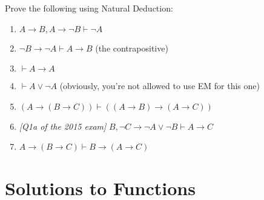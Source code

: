 \documentclass[10pt,a4paper]{article}
\begin{document}
Prove the following using Natural Deduction:

\begin{enumerate}
    \item \( A \rightarrow B , A \rightarrow \neg B \vdash \neg A \)
    \item \( \neg B \rightarrow \neg A \vdash A \rightarrow B \) (the contrapositive)
    \item \( \vdash A \rightarrow A \)
    \item \( \vdash A \lor \neg A \) (obviously, you're not allowed to use EM for this one)
    \item \( \left( A \rightarrow (B \rightarrow C ) \right) \vdash 
    \left( (A \rightarrow B) \rightarrow (A \rightarrow C) \right) \)
    \item \emph{[Q1a of the 2015 exam]} \( B, \neg C \rightarrow \neg A \lor \neg B \vdash A \rightarrow C \)
    \item \( A \rightarrow ( B \rightarrow C ) \vdash B \rightarrow ( A \rightarrow C) \)
\end{enumerate}

\newpage

\section{Solutions to Functions}
\end{document}
